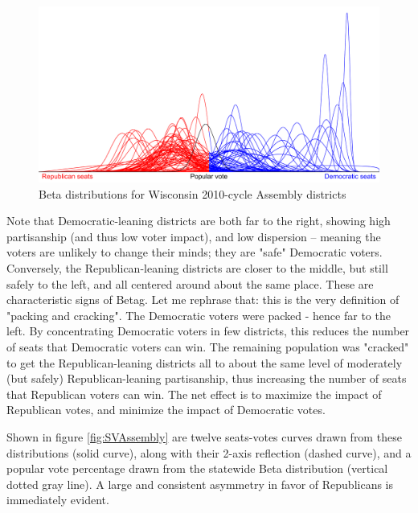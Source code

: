 \documentclass[preprint,12pt]{article}
\begin{document}
\begin{figure}[htb!]
    \begin{center}
        \includegraphics[scale=0.25]{../Figures/WI2010/Betas_cropped.png}
        \caption{Beta distributions for Wisconsin 2010-cycle Assembly districts}\label{fig:Betas}
    \end{center}
\end{figure}
 
Note that Democratic-leaning districts are both far to the right, showing high partisanship (and thus low voter impact), and low dispersion -- meaning the voters are unlikely to change their minds; they are "safe" Democratic voters.  Conversely, the Republican-leaning districts are closer to the middle, but still safely to the left, and all centered around about the same place.   These are characteristic signs of Betag.  Let me rephrase that: this is the very definition of "packing and cracking".  The Democratic voters were packed - hence far to the left.  By concentrating Democratic voters in few districts, this reduces the number of seats that Democratic voters can win.  The remaining population was "cracked" to get the Republican-leaning districts all to about the same level of moderately (but safely) Republican-leaning partisanship, thus increasing the number of seats that Republican voters can win.  The net effect is to maximize the impact of Republican votes, and minimize the impact of Democratic votes.
 
Shown in figure \ref{fig:SVAssembly} are twelve seats-votes curves drawn from these distributions (solid curve), along with their 2-axis reflection (dashed curve), and a popular vote percentage drawn from the statewide Beta distribution (vertical dotted gray line).  A large and consistent asymmetry in favor of Republicans is immediately evident.
\end{document}

